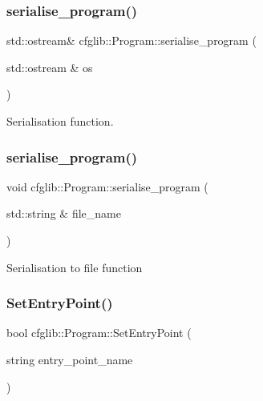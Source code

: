 \subsubsection{\texorpdfstring{serialise\+\_\+program()}{serialise\_program()}\hspace{0.1cm}{\footnotesize\ttfamily [1/2]}}
{\footnotesize\ttfamily std\+::ostream\& cfglib\+::\+Program\+::serialise\+\_\+program (\begin{DoxyParamCaption}\item[{std\+::ostream \&}]{os }\end{DoxyParamCaption})}

Serialisation function. \mbox{\label{classcfglib_1_1Program_a2eb2e99e2d6dfbb346e23bebba01d2b3}} 
\subsubsection{\texorpdfstring{serialise\+\_\+program()}{serialise\_program()}\hspace{0.1cm}{\footnotesize\ttfamily [2/2]}}
{\footnotesize\ttfamily void cfglib\+::\+Program\+::serialise\+\_\+program (\begin{DoxyParamCaption}\item[{std\+::string \&}]{file\+\_\+name }\end{DoxyParamCaption})}

Serialisation to file function \mbox{\label{classcfglib_1_1Program_a08aa67ec59bdbd28572dc222fdd2e3da}} 
\subsubsection{\texorpdfstring{Set\+Entry\+Point()}{SetEntryPoint()}\hspace{0.1cm}{\footnotesize\ttfamily [1/2]}}
{\footnotesize\ttfamily bool cfglib\+::\+Program\+::\+Set\+Entry\+Point (\begin{DoxyParamCaption}\item[{string}]{entry\+\_\+point\+\_\+name }\end{DoxyParamCaption})}

